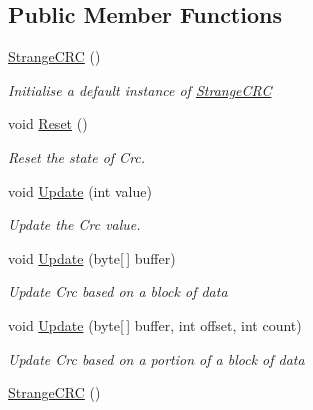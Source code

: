 \subsection*{Public Member Functions}
\begin{DoxyCompactItemize}
\item 
\hyperlink{class_i_c_sharp_code_1_1_sharp_zip_lib_1_1_checksums_1_1_strange_c_r_c_a3c15e96430b164601075ffa012bd21a5}{Strange\+C\+RC} ()
\begin{DoxyCompactList}\small\item\em Initialise a default instance of \hyperlink{class_i_c_sharp_code_1_1_sharp_zip_lib_1_1_checksums_1_1_strange_c_r_c}{Strange\+C\+RC} \end{DoxyCompactList}\item 
void \hyperlink{class_i_c_sharp_code_1_1_sharp_zip_lib_1_1_checksums_1_1_strange_c_r_c_aca2448f26ffa4b9350696a62352b6673}{Reset} ()
\begin{DoxyCompactList}\small\item\em Reset the state of Crc. \end{DoxyCompactList}\item 
void \hyperlink{class_i_c_sharp_code_1_1_sharp_zip_lib_1_1_checksums_1_1_strange_c_r_c_a23b221cea3b706bd2e7c9fb8afb5786b}{Update} (int value)
\begin{DoxyCompactList}\small\item\em Update the Crc value. \end{DoxyCompactList}\item 
void \hyperlink{class_i_c_sharp_code_1_1_sharp_zip_lib_1_1_checksums_1_1_strange_c_r_c_aab01b02459d969f26576d15ac7cf3924}{Update} (byte\mbox{[}$\,$\mbox{]} buffer)
\begin{DoxyCompactList}\small\item\em Update Crc based on a block of data \end{DoxyCompactList}\item 
void \hyperlink{class_i_c_sharp_code_1_1_sharp_zip_lib_1_1_checksums_1_1_strange_c_r_c_a7be42e910338b16cfdea59bfcc8755df}{Update} (byte\mbox{[}$\,$\mbox{]} buffer, int offset, int count)
\begin{DoxyCompactList}\small\item\em Update Crc based on a portion of a block of data \end{DoxyCompactList}\item 
\hyperlink{class_i_c_sharp_code_1_1_sharp_zip_lib_1_1_checksums_1_1_strange_c_r_c_a3c15e96430b164601075ffa012bd21a5}{Strange\+C\+RC} ()

\end{DoxyCompactItemize}
